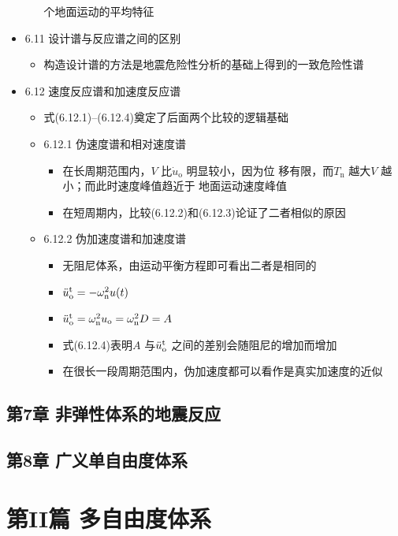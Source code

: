 \documentclass[11pt]{article}
\begin{document}
\begin{itemize}
\begin{itemize}
个地面运动的平均特征
\end{itemize}
\item 6.11 设计谱与反应谱之间的区别
\label{sec:orgbde4e03}
\begin{itemize}
\item 构造设计谱的方法是地震危险性分析的基础上得到的一致危险性谱
\end{itemize}
\item 6.12 速度反应谱和加速度反应谱
\label{sec:org99fcfef}
\begin{itemize}
\item 式(6.12.1)--(6.12.4)奠定了后面两个比较的逻辑基础
\end{itemize}
\begin{itemize}
\item 6.12.1 伪速度谱和相对速度谱
\label{sec:org493c5a0}
\begin{itemize}
\item 在长周期范围内，\(V\) 比\(\dot{u}_{\mathrm{o}}\) 明显较小，因为位
移有限，而\(T_{\mathrm{n}}\) 越大\(V\) 越小；而此时速度峰值趋近于
地面运动速度峰值
\item 在短周期内，比较(6.12.2)和(6.12.3)论证了二者相似的原因
\end{itemize}
\item 6.12.2 伪加速度谱和加速度谱
\label{sec:orgba75141}
\begin{itemize}
\item 无阻尼体系，由运动平衡方程即可看出二者是相同的
\item \(\ddot{u}^{\mathrm{t}}_\mathrm{o}=-\omega^{2}_\mathrm{n}u(t)\)
\item \(\ddot{u}^{\mathrm{t}}_\mathrm{o}=\omega^{2}_\mathrm{n} u_\mathrm{o}=\omega^{2}_\mathrm{n} D=A\)
\item 式(6.12.4)表明\(A\) 与\(\ddot{u}^{\mathrm{t}}_\mathrm{o}\) 之间的差别会随阻尼的增加而增加
\item 在很长一段周期范围内，伪加速度都可以看作是真实加速度的近似
\end{itemize}
\end{itemize}
\end{itemize}
\subsection*{第7章 非弹性体系的地震反应}
\label{sec:orgab60274}
\subsection*{第8章 广义单自由度体系}
\label{sec:orgcab88fc}
\section*{第II篇 多自由度体系}
\label{sec:orgbe7cb2d}
\end{document}
